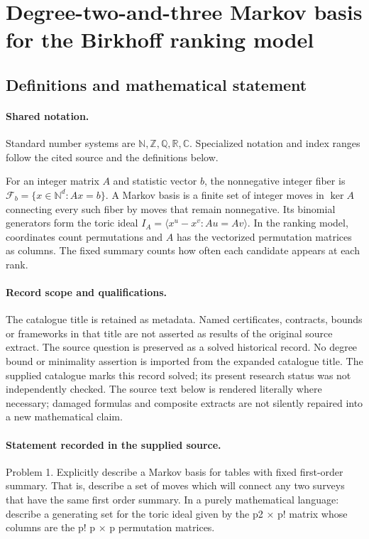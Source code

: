 \documentclass[11pt]{article}
\begin{document}
\section{Degree-two-and-three Markov basis for the Birkhoff ranking model}\label{statement}

\subsection{Definitions and mathematical statement}

\paragraph{Shared notation.}Standard number systems are $\mathbb N,\mathbb Z,\mathbb Q,\mathbb R,\mathbb C$. Specialized notation and index ranges follow the cited source and the definitions below.


For an integer matrix $A$ and statistic vector $b$, the nonnegative integer fiber is $\mathcal F_b=\{x\in\mathbb N^d:Ax=b\}$. A Markov basis is a finite set of integer moves in $\ker A$ connecting every such fiber by moves that remain nonnegative. Its binomial generators form the toric ideal $I_A=\langle x^u-x^v:Au=Av\rangle$. In the ranking model, coordinates count permutations and $A$ has the vectorized permutation matrices as columns. The fixed summary counts how often each candidate appears at each rank.
\paragraph{Record scope and qualifications.}
The catalogue title is retained as metadata. Named certificates, contracts, bounds or frameworks in that title are not asserted as results of the original source extract.
The source question is preserved as a solved historical record. No degree bound or minimality assertion is imported from the expanded catalogue title. The supplied catalogue marks this record solved; its present research status was not independently checked.
The source text below is rendered literally where necessary; damaged formulas and composite extracts are not silently repaired into a new mathematical claim.
\paragraph{Statement recorded in the supplied source.}
Problem 1. Explicitly describe a Markov basis for tables with fixed first-order summary. That is, describe a set of moves which will connect any two surveys that have the same first order summary. In a purely mathematical language: describe a generating set for the toric ideal given by the p2 × p! matrix whose columns are the p! p × p permutation matrices.
\end{document}
